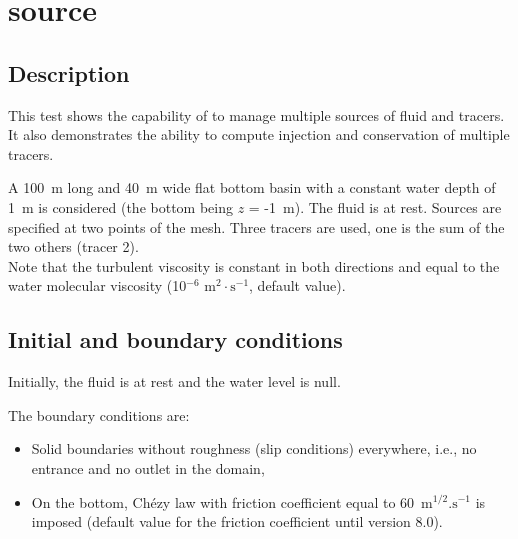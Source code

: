 \chapter{source}

\section{Description}
\bigskip
This test shows the capability of  to manage multiple
sources of fluid and tracers.
It also demonstrates the ability to compute injection and conservation
of multiple tracers.

%
\bigskip
A 100~m long and 40~m wide flat bottom basin with a constant water depth of 1~m is
considered (the bottom being $z$ = -1~m). The fluid is at rest.
Sources are specified at two points of the mesh.
Three tracers are used, one is the sum of the two others (tracer 2).\\
Note that the turbulent viscosity is constant in both directions 
and equal to the water molecular viscosity (10$^{-6}$ m$^2\cdot\text{s}^{-1}$,
default value).


\section{Initial and boundary conditions}
%
\bigskip
Initially, the fluid is at rest and the water level is null.

\bigskip
The boundary conditions are:
\begin{itemize}
\item Solid boundaries without roughness (slip conditions) everywhere,
 i.e., no entrance and no outlet in the domain,
\item On the bottom, Chézy law with friction coefficient equal to 
60~$\text{m}^{1/2}.\text{s}^{-1}$ is imposed (default value
for the friction coefficient until version 8.0).
\end{itemize}

